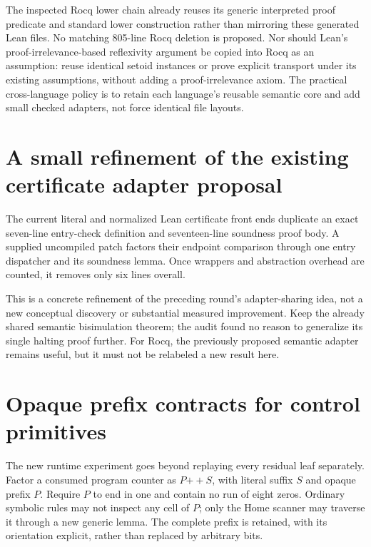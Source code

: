 \documentclass[11pt]{article}
\begin{document}
The inspected Rocq lower chain already reuses its generic interpreted proof predicate and standard lower construction rather than mirroring these generated Lean files. No matching 805-line Rocq deletion is proposed. Nor should Lean's proof-irrelevance-based reflexivity argument be copied into Rocq as an assumption: reuse identical setoid instances or prove explicit transport under its existing assumptions, without adding a proof-irrelevance axiom. The practical cross-language policy is to retain each language's reusable semantic core and add small checked adapters, not force identical file layouts.

\section{A small refinement of the existing certificate adapter proposal}
The current literal and normalized Lean certificate front ends duplicate an exact seven-line entry-check definition and seventeen-line soundness proof body. A supplied uncompiled patch factors their endpoint comparison through one entry dispatcher and its soundness lemma. Once wrappers and abstraction overhead are counted, it removes only six lines overall.

This is a concrete refinement of the preceding round's adapter-sharing idea, not a new conceptual discovery or substantial measured improvement. Keep the already shared semantic bisimulation theorem; the audit found no reason to generalize its single halting proof further. For Rocq, the previously proposed semantic adapter remains useful, but it must not be relabeled a new result here.

\section{Opaque prefix contracts for control primitives}
The new runtime experiment goes beyond replaying every residual leaf separately. Factor a consumed program counter as $P\mathbin{+\!+}S$, with literal suffix $S$ and opaque prefix $P$. Require $P$ to end in one and contain no run of eight zeros. Ordinary symbolic rules may not inspect any cell of $P$; only the Home scanner may traverse it through a new generic lemma. The complete prefix is retained, with its orientation explicit, rather than replaced by arbitrary bits.
\end{document}
